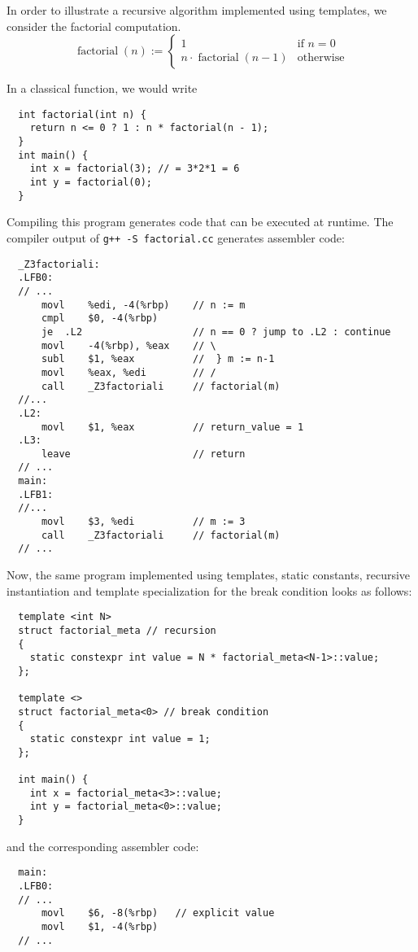 In order to illustrate a recursive algorithm implemented using templates, we consider the factorial computation.
\[
  \operatorname{factorial}(n) := \left\{\begin{array}{ll} 1 & \text{if }n = 0 \\ n \cdot \operatorname{factorial}(n-1) & \text{otherwise} \end{array}\right.
\]

In a classical function, we would write
\begin{verbatim}
  int factorial(int n) {
    return n <= 0 ? 1 : n * factorial(n - 1);
  }
  int main() {
    int x = factorial(3); // = 3*2*1 = 6
    int y = factorial(0);
  }
\end{verbatim}
Compiling this program generates code that can be executed at runtime.
The compiler output of \texttt{g++ -S factorial.cc} generates assembler code:
\begin{verbatim}
  _Z3factoriali:
  .LFB0:
  // ...
      movl    %edi, -4(%rbp)    // n := m
      cmpl    $0, -4(%rbp)
      je  .L2                   // n == 0 ? jump to .L2 : continue
      movl    -4(%rbp), %eax    // \
      subl    $1, %eax          //  } m := n-1
      movl    %eax, %edi        // /
      call    _Z3factoriali     // factorial(m)
  //...
  .L2:
      movl    $1, %eax          // return_value = 1
  .L3:
      leave                     // return
  // ...
  main:
  .LFB1:
  //...
      movl    $3, %edi          // m := 3
      call    _Z3factoriali     // factorial(m)
  // ...
\end{verbatim}

Now, the same program implemented using templates, static constants, recursive instantiation and template specialization for the break condition
looks as follows:
\begin{verbatim}
  template <int N>
  struct factorial_meta // recursion
  {
    static constexpr int value = N * factorial_meta<N-1>::value;
  };

  template <>
  struct factorial_meta<0> // break condition
  {
    static constexpr int value = 1;
  };

  int main() {
    int x = factorial_meta<3>::value;
    int y = factorial_meta<0>::value;
  }
\end{verbatim}
and the corresponding assembler code:

\begin{verbatim}
  main:
  .LFB0:
  // ...
      movl    $6, -8(%rbp)   // explicit value
      movl    $1, -4(%rbp)
  // ...
\end{verbatim}


